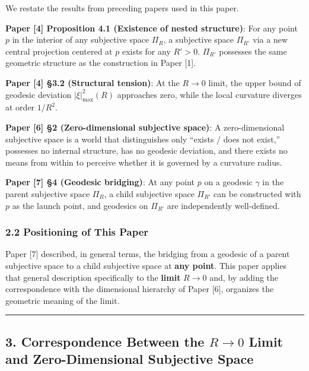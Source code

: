 \documentclass[a4paper,11pt]{article}
\theoremstyle{definition}
\begin{document}
We restate the results from preceding papers used in this paper.

\textbf{Paper {[}4{]} Proposition 4.1 (Existence of nested structure)}:
For any point \(p\) in the interior of any subjective space \(\Pi_R\), a
subjective space \(\Pi_{R'}\) via a new central projection centered at
\(p\) exists for any \(R' > 0\). \(\Pi_{R'}\) possesses the same
geometric structure as the construction in Paper {[}1{]}.

\textbf{Paper {[}4{]} §3.2 (Structural tension)}: At the \(R \to 0\)
limit, the upper bound of geodesic deviation \(|\xi|^2_{\max}(R)\)
approaches zero, while the local curvature diverges at order \(1/R^2\).

\textbf{Paper {[}6{]} §2 (Zero-dimensional subjective space)}: A
zero-dimensional subjective space is a world that distinguishes only
``exists / does not exist,'' possesses no internal structure, has no
geodesic deviation, and there exists no means from within to perceive
whether it is governed by a curvature radius.

\textbf{Paper {[}7{]} §4 (Geodesic bridging)}: At any point \(p\) on a
geodesic \(\gamma\) in the parent subjective space \(\Pi_R\), a child
subjective space \(\Pi_{R'}\) can be constructed with \(p\) as the
launch point, and geodesics on \(\Pi_{R'}\) are independently
well-defined.

\subsubsection{2.2 Positioning of This
Paper}\label{positioning-of-this-paper}

Paper {[}7{]} described, in general terms, the bridging from a geodesic
of a parent subjective space to a child subjective space at \textbf{any
point}. This paper applies that general description specifically to the
\textbf{limit} \(R \to 0\) and, by adding the correspondence with the
dimensional hierarchy of Paper {[}6{]}, organizes the geometric meaning
of the limit.

\begin{center}\rule{0.5\linewidth}{0.5pt}\end{center}

\subsection{\texorpdfstring{3. Correspondence Between the \(R \to 0\)
Limit and Zero-Dimensional Subjective
Space}{3. Correspondence Between the R \textbackslash to 0 Limit and Zero-Dimensional Subjective Space}}\label{correspondence-between-the-r-to-0-limit-and-zero-dimensional-subjective-space}
\end{document}
